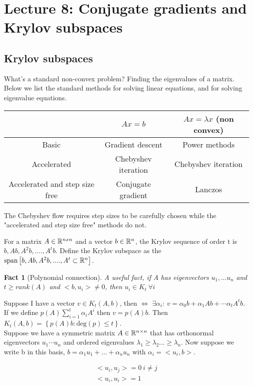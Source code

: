 \documentclass[12pt]{article}
\newtheorem{Fact}{Fact}
\begin{document}
\section{Lecture 8: Conjugate gradients and Krylov subspaces}

\subsection{Krylov subspaces}
What's a standard non-convex problem? Finding the eigenvalues of a matrix. Below we list the standard methods for solving linear equations, and for solving eigenvalue equations. 
\begin{center}
\begin{tabular}{ | c |c| c | } 
\hline
 & $Ax=b$ & $Ax=\lambda x$ (non convex) \\ 
\hline
Basic & Gradient descent & Power methods \\ 
\hline
Accelerated & Chebyshev iteration & Chebyshev iteration \\
\hline
Accelerated and step size free & Conjugate gradient & Lanczos \\
\hline
\end{tabular}
\end{center}
\begin{remark}[Chebyshev]
The Chebyshev flow requires step sizes to be carefully chosen while the "accelerated and step size free" methods do not.
\end{remark}
\begin{definition}
For a matrix $A \in \mathbb{R}^{n x n}$ and a vector \(b \in \mathbb{R}^n \), 
the Krylov sequence of order t is $b, Ab, A^2b, ...., A^tb$. Define the Krylov subspace as the $\text{span} \left[b, Ab, A^2b, ...., A^t \subset \mathbb{R}^n \right]$. 
\end{definition}
\begin{Fact}[Polynomial connection]
A useful fact, if A has eigenvectors $u_1, ... u_n$ and $t \geq rank(A)$ and \(<b,u_i> \neq 0\), then \(u_i \in K_t \ \forall i\)
\end{Fact}


Suppose I have a vector $v \in K_t(A,b)$, then $\Longleftrightarrow$  $\exists \alpha_i: \ v= \alpha_0 b + \alpha_1 Ab + \cdots \alpha_t A^tb$. If we define $p(A) \sum_{i=1}^t \alpha_i A^i$ then $v = p(A)b$. Then $K_t(A,b) = \left\{ p(A)b : \text{deg}(p) \leq t \right\}$. \\

Suppose we have a symmetric matrix \(A \in \mathbb{R}^{n \times n}\) that has orthonormal eigenvectors \(u_1 \cdots u_n\) and ordered eigenvalues \(\lambda_1 \geq \lambda_2 \ldots \geq \lambda_n\). Now suppose we write b in this basis, $b=\alpha_1 u_1 + ... + \alpha_n u_n$ with \(\alpha_i = <u_i,b>\). 
\begin{remark}
\begin{align*}
    <u_i,u_j> = 0 \ i \neq j \\
    <u_i, u_i> = 1 
\end{align*}
\end{remark}
\end{document}
